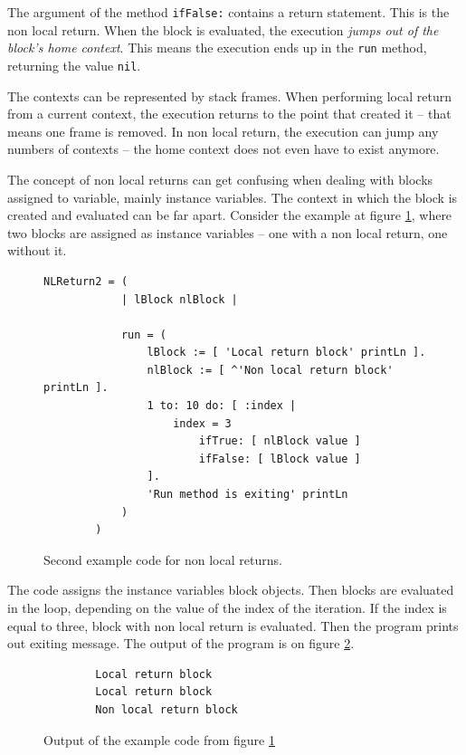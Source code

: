 \documentclass[thesis=M,english]{FITthesis}[2019/12/23]
\begin{document}
The argument of the method \texttt{ifFalse:} contains a return statement. This is the non local return. When the block is
evaluated, the execution \textit{jumps out of the block's home context}. This means the execution ends up in the \texttt{run}
method, returning the value \texttt{nil}.

The contexts can be represented by stack frames. When performing local return from a current context, the execution returns to the
point that created it -- that means one frame is removed. In non local return, the execution can jump any numbers of contexts -- the
home context does not even have to exist anymore.

The concept of non local returns can get confusing when dealing with blocks assigned to variable, mainly instance variables.
The context in which the block is created and evaluated can be far apart. Consider the example at figure \ref{fig:nlreturn_2}, where two blocks are
assigned as instance variables -- one with a non local return, one without it.

\begin{figure}
	\centering
	\begin{lstlisting}[language=Smalltalk]
		NLReturn2 = (
			| lBlock nlBlock |

			run = (
				lBlock := [ 'Local return block' printLn ].
				nlBlock := [ ^'Non local return block' printLn ].
				1 to: 10 do: [ :index |
					index = 3
						ifTrue: [ nlBlock value ]
						ifFalse: [ lBlock value ]
				].
				'Run method is exiting' printLn
			)
		)
	\end{lstlisting}
	\caption{Second example code for non local returns.}
	\label{fig:nlreturn_2}
\end{figure}

The code assigns the instance variables block objects. Then blocks are evaluated in the loop, depending on the value
of the index of the iteration. If the index is equal to three, block with non local return is evaluated. Then the program
prints out exiting message. The output of the program is on figure \ref{fig:nlreturn_2_output}.

\begin{figure}[h!]
	\centering
	\begin{verbatim}
		Local return block
		Local return block
		Non local return block
	\end{verbatim}
	\caption{Output of the example code from figure \ref{fig:nlreturn_2}}
	\label{fig:nlreturn_2_output}
\end{figure}
\end{document}
